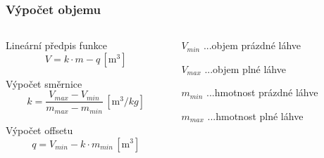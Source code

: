 \documentclass[%
  12pt,       				%
	t,                  %
	aspectratio=1610,   %
	unicode,						%
]{beamer}				    	%
\begin{document}
\begin{frame} %
    \frametitle{Výpočet objemu}  
    \begin{columns}[T]
    \begin{column}{0.6\textwidth}
      \begin{alertblock}{Lineární předpis funkce}
	   	$$ V = k \cdot m - q\, \left[\mathrm{m^3}\right] $$
	   \end{alertblock}
    
     \begin{block}{Výpočet směrnice}
	   	$$ k = \frac{V_{max}-V_{min}}{m_{max}-m_{min}}\, \left[\mathrm{m^3}/kg\right] $$
	   \end{block}
    
      \begin{block}{Výpočet offsetu}
	   	$$ q = V_{min} - k \cdot m_{min}\, \left[\mathrm{m^3}\right] $$
	   \end{block}
    \end{column}

 \begin{column}{0.4\textwidth}
 \vspace{0.5cm}
 \(V_{min}\) ...objem prázdné láhve

\(V_{max}\) ...objem plné láhve

\(m_{min}\) ...hmotnost prázdné láhve

\(m_{max}\) ...hmotnost plné láhve
\end{column}
 \end{columns}

\end{frame}

\end{document}
